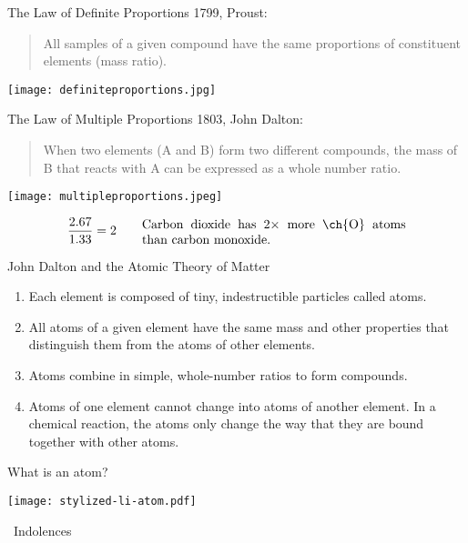 \documentclass[notes=only]{beamer}
\begin{document}
\begin{frame}{The Law of Definite Proportions}
	1799, Proust:
	\begin{quote}
		All samples of a given compound have the same proportions of
		constituent elements (mass ratio).
	\end{quote}

	\begin{center}
		\texttt{[image: definiteproportions.jpg]}
	\end{center}
\end{frame}

\begin{frame}{The Law of Multiple Proportions}
	1803, John Dalton:
	\begin{quote}
		When two elements (A and B) form two different compounds, the
		mass of B that reacts with A can be expressed as a whole number
		ratio.
	\end{quote}

	\begin{center}
		\texttt{[image: multipleproportions.jpeg]}
	\end{center}

	\begin{equation*}
		\frac{2.67}{1.33} = 2 \qquad
		\text{\parbox{0.6\linewidth}{Carbon dioxide has $2 \times$
		more \ch{O} atoms than carbon monoxide.}}
	\end{equation*}
\end{frame}

\begin{frame}{John Dalton and the Atomic Theory of Matter}
	\begin{enumerate}[<+->]
		\item Each element is composed of tiny, indestructible particles
			called atoms.
		\item All atoms of a given element have the same mass and other
			properties that distinguish them from the atoms of other
			elements.
		\item Atoms combine in simple, whole-number ratios to form
			compounds.
		\item Atoms of one element cannot change into atoms of another
			element. In a chemical reaction, the atoms only change
			the way that they are \alert{bound together} with other
			atoms.
	\end{enumerate}
\end{frame}

\begin{frame}{What is an atom?}
	\centering

	\texttt{[image: stylized-li-atom.pdf]}

	\bigskip

	\tiny\ccbysa\ Indolences
\end{frame}
\end{document}
